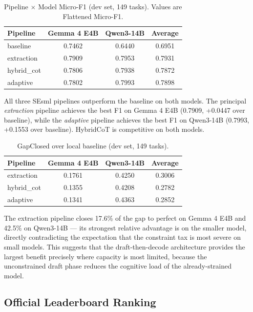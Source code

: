 \documentclass{ceurart}
\begin{document}
\begin{table}
  \caption{Pipeline $\times$ Model Micro-F1 (dev set, 149 tasks). Values are Flattened Micro-F1.}
  \label{tab:overall-dev}
  \centering
  \begin{tabular}{lccc}
    \toprule
    Pipeline & Gemma 4 E4B & Qwen3-14B & Average \\
    \midrule
    baseline   & 0.7462 & 0.6440 & 0.6951 \\
    extraction & 0.7909 & 0.7953 & 0.7931 \\
    hybrid\_cot & 0.7806 & 0.7938 & 0.7872 \\
    adaptive   & 0.7802 & 0.7993 & 0.7898 \\
    \bottomrule
  \end{tabular}
\end{table}

All three SEsml pipelines outperform the baseline on both models.
The principal \emph{extraction} pipeline achieves the best F1 on Gemma 4 E4B
(0.7909, +0.0447 over baseline), while the \emph{adaptive} pipeline achieves the best
F1 on Qwen3-14B (0.7993, +0.1553 over baseline).
HybridCoT is competitive on both models.

\begin{table}
  \caption{GapClosed over local baseline (dev set, 149 tasks).}
  \label{tab:gapclosed-dev}
  \centering
  \begin{tabular}{lccc}
    \toprule
    Pipeline & Gemma 4 E4B & Qwen3-14B & Average \\
    \midrule
    extraction  & 0.1761 & 0.4250 & 0.3006 \\
    hybrid\_cot  & 0.1355 & 0.4208 & 0.2782 \\
    adaptive    & 0.1341 & 0.4363 & 0.2852 \\
    \bottomrule
  \end{tabular}
\end{table}

The extraction pipeline closes 17.6\% of the gap to perfect on Gemma 4 E4B and 42.5\%
on Qwen3-14B --- its strongest relative advantage is on the smaller model, directly
contradicting the expectation that the constraint tax is most severe on small models.
This suggests that the draft-then-decode architecture provides the largest benefit
precisely where capacity is most limited, because the unconstrained draft phase reduces
the cognitive load of the already-strained model.

\subsection{Official Leaderboard Ranking}
\label{sec:leaderboard-ranking}
\end{document}
